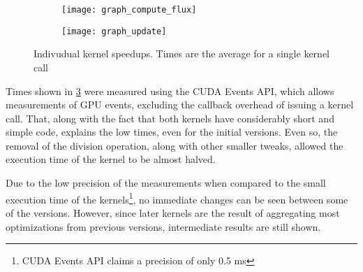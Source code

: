 \begin{figure}[!htp]
	\begin{subfigure}[b]{\columnwidth}
		\centering
		\texttt{[image: graph\_compute\_flux]}
		\caption{\computeflux}
		\label{fig:time_computeflux}
	\end{subfigure}
	\begin{subfigure}[b]{\columnwidth}
		\centering
		\texttt{[image: graph\_update]}
		\caption{\update}
		\label{fig:time_update}
	\end{subfigure}

	\caption{Indivudual kernel speedups. Times are the average for a single kernel call}
	\label{fig:time_kernels}
\end{figure}

Times shown in \cref{fig:time_kernels} were measured using the CUDA Events API, which allows measurements of GPU events, excluding the callback overhead of issuing a kernel call. That, along with the fact that both kernels have considerably short and simple code, explains the low times, even for the initial versions. Even so, the removal of the division operation, along with other smaller tweaks, allowed the execution time of the \update kernel to be almost halved.

Due to the low precision of the measurements when compared to the small execution time of the kernels\footnote{CUDA Events API claims a precision of only 0.5 ms}, no immediate changes can be seen between some of the versions. However, since later kernels are the result of aggregating most optimizations from previous versions, intermediate results are still shown.
